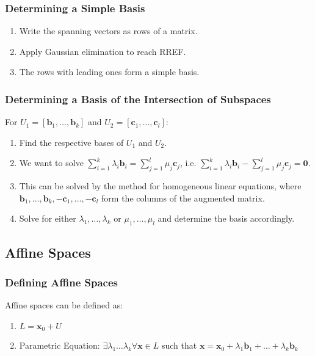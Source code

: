 \documentclass[10pt,twoside,twocolumn]{article}
\begin{document}
\subsubsection{Determining a Simple Basis}
\begin{enumerate}
\item Write the spanning vectors as rows of a matrix. 
\item Apply Gaussian elimination to reach RREF. 
\item The rows with leading ones form a simple basis. 
\end{enumerate}

\subsubsection{Determining a Basis of the Intersection of Subspaces}

For $U_{1}=\left[\mathbf{b}_{1},\dots,\mathbf{b}_{k}\right]$ and
$U_{2}=\left[\mathbf{c}_{1},\dots,\mathbf{c}_{l}\right]$: 
\begin{enumerate}
\item Find the respective bases of $U_{1}$ and $U_{2}$.
\item We want to solve $\sum_{i=1}^{k}\lambda_{i}\mathbf{b}_{i}=\sum_{j=1}^{l}\mu_{j}\mathbf{c}_{j}$,
i.e. $\sum_{i=1}^{k}\lambda_{i}\mathbf{b}_{i}-\sum_{j=1}^{l}\mu_{j}\mathbf{c}_{j}=\mathbf{0}$. 
\item This can be solved by the method for homogeneous linear equations,
where $\mathbf{b}_{1},\dots,\mathbf{b}_{k},-\mathbf{c}_{1},\dots,-\mathbf{c}_{l}$
form the columns of the augmented matrix. 
\item Solve for either $\lambda_{1},\dots,\lambda_{k}$ or $\mu_{1},\dots,\mu_{l}$
and determine the basis accordingly. 
\end{enumerate}

\subsection{Affine Spaces}


\subsubsection{Defining Affine Spaces}

Affine spaces can be defined as: 
\begin{enumerate}
\item $L=\mathbf{x}_{0}+U$ 
\item Parametric Equation: $\exists\lambda_{1}\dots\lambda_{k}\forall\mathbf{x}\in L$
such that $\mathbf{x}=\mathbf{x}_{0}+\lambda_{1}\mathbf{b}_{1}+\dots+\lambda_{k}\mathbf{b}_{k}$ 
\end{enumerate}
\end{document}
